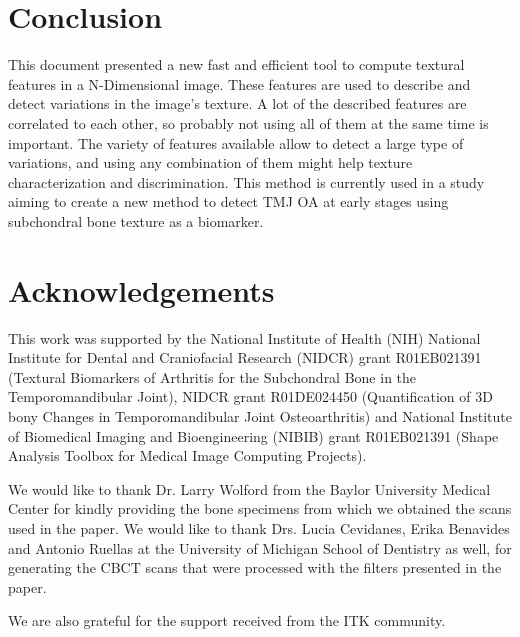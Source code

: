 \documentclass{InsightArticle}
\begin{document}
\newpage
\section{Conclusion}
\label{sec:conclusions}

This document presented a new fast and efficient tool to compute textural features in a  N-Dimensional image. These features are used to describe and detect variations in the image's texture. A lot of the described features are correlated to each other, so probably not using all of them at the same time is important. The variety of features available allow to detect a large type of variations, and using any combination of them might help texture characterization and discrimination. This method is currently used in a study aiming to create a new method to detect TMJ OA at early stages using subchondral bone texture as a biomarker.

\section*{Acknowledgements}

This work was supported by the National Institute of Health (NIH) National Institute for Dental and Craniofacial Research (NIDCR) grant R01EB021391 (Textural Biomarkers of Arthritis for the Subchondral Bone in the Temporomandibular Joint), NIDCR grant R01DE024450  (Quantification of 3D bony Changes in Temporomandibular Joint Osteoarthritis) and National Institute of Biomedical Imaging and Bioengineering (NIBIB) grant R01EB021391 (Shape Analysis Toolbox for Medical Image Computing Projects). 

We would like to thank Dr. Larry Wolford from the Baylor University Medical Center for kindly providing the bone specimens from which we obtained the scans used in the paper. We would like to thank Drs. Lucia Cevidanes, Erika Benavides and Antonio Ruellas at the University of Michigan School of Dentistry as well, for generating the CBCT scans that were processed with the filters presented in the paper.

We are also grateful for the support received from the ITK community.

%
%
\newpage


\end{document}

